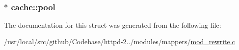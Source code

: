 \subsubsection[{\texorpdfstring{pool}{pool}}]{$\ast$ cache\+::pool}\hypertarget{structcache_a79d8858cd01a77bb888a087f5f3fdc6d}{}\label{structcache_a79d8858cd01a77bb888a087f5f3fdc6d}


The documentation for this struct was generated from the following file\+:\begin{DoxyCompactItemize}
\item 
/usr/local/src/github/\+Codebase/httpd-\/2../modules/mappers/\hyperlink{mod__rewrite_8c}{mod\+\_\+rewrite.\+c}\end{DoxyCompactItemize}
